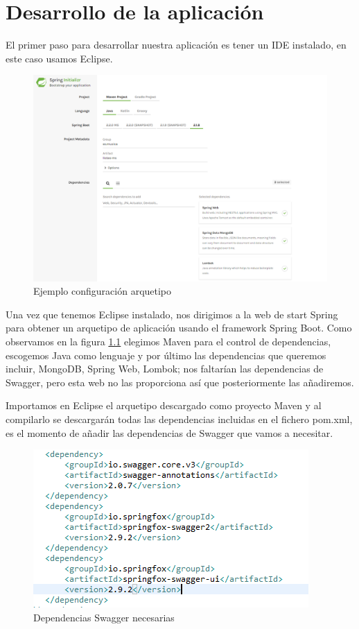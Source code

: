 \documentclass[12pt]{report} %
\begin{document}
\chapter{Desarrollo de la aplicación}

El primer paso para desarrollar nuestra aplicación es tener un IDE instalado, en este caso usamos Eclipse.

\begin{figure}
	\centering
	\includegraphics[width=0.7\linewidth]{imagenes/arquetipo}
	\caption{Ejemplo configuración arquetipo}
	\label{fig:arquetipo}
\end{figure}

Una vez que tenemos Eclipse instalado, nos dirigimos a la web de start Spring \cite{startSpring} para obtener un arquetipo de aplicación usando el framework Spring Boot. Como observamos en la figura \ref{fig:arquetipo} elegimos Maven para el control de dependencias, escogemos Java como lenguaje y por último las dependencias que queremos incluir, MongoDB, Spring Web, Lombok; nos faltarían las dependencias de Swagger, pero esta web no las proporciona así que posteriormente las añadiremos.

Importamos en Eclipse el arquetipo descargado como proyecto Maven y al compilarlo se descargarán todas las dependencias incluidas en el fichero pom.xml, es el momento de añadir las dependencias de Swagger que vamos a necesitar.

\begin{figure}
	\centering
	\includegraphics[width=0.7\linewidth]{imagenes/dependenciasSwagger}
	\caption{Dependencias Swagger necesarias}
	\label{fig:dependenciasswagger}
\end{figure}
\end{document}
